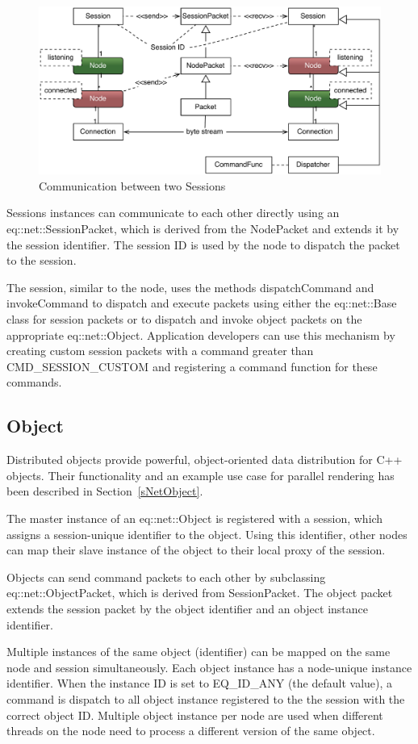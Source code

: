 \documentclass[10pt,a4]{scrartcl}
\newcommand{\sref}[1]{Section~\ref{#1}}
\begin{document}
\begin{figure}
  \includegraphics[width=.618\textwidth]{images/netSession.pdf}
  {\caption{\label{fNetSession}Communication between two Sessions}}
\end{figure}
Sessions instances can communicate to each other directly using an
\textsf{eq::net::Ses\-sion\-Packet}, which is derived from the
\textsf{NodePacket} and extends it by the session identifier. The
session ID is used by the node to dispatch the packet to the session.

The session, similar to the node, uses the methods
\textsf{dispatchCommand} and \textsf{invokeCommand} to dispatch and
execute packets using either the \textsf{eq::net::Base} class for
session packets or to dispatch and invoke object packets on the
appropriate \textsf{eq::net::Object}. Application developers can use
this mechanism by creating custom session packets with a command greater
than \textsf{CMD\_SESSION\_CUSTOM} and registering a command function
for these commands.


\subsection{\label{sNetObject2}Object}

Distributed objects provide powerful, object-oriented data
distribution for C++ objects. Their functionality and an example use
case for parallel rendering has been described in \sref{sNetObject}.

The master instance of an \textsf{eq::net::Object} is registered with a
session, which assigns a session-unique identifier to the object. Using
this identifier, other nodes can map their slave instance of the object
to their local proxy of the session.

Objects can send command packets to each other by subclassing
\textsf{eq::net::Ob\-ject\-Packet}, which is derived from
\textsf{SessionPacket}. The object packet extends the session packet by
the object identifier and an object instance identifier.

Multiple instances of the same object (identifier) can be mapped on the
same node and session simultaneously. Each object instance has a
node-unique instance identifier. When the instance ID is set to
\textsf{EQ\_ID\_ANY} (the default value), a command is dispatch to all
object instance registered to the the session with the correct object
ID. Multiple object instance per node are used when different threads on
the node need to process a different version of the same object.
\end{document}
